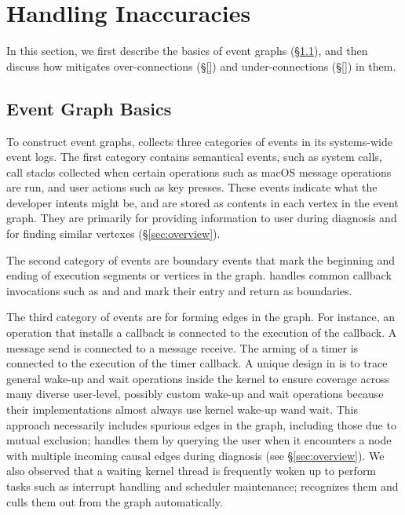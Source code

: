 \section{Handling Inaccuracies}\label{sec:graphcomputing}

In this section, we first describe the basics of \xxx event graphs
(\S\ref{subsec:eventgraph}), and then discuss how \xxx mitigates
over-connections (\S\ref{}) and under-connections (\S\ref{}) in them.

\subsection{Event Graph Basics}\label{subsec:eventgraph}

To construct event graphs, \xxx collects three categories of events in its
systems-wide event logs.  The first category contains semantical events,
such as system calls, call stacks collected when certain operations such
as macOS message operations are run, and user actions such as key presses.
These events indicate what the developer intents might be, and are stored
as contents in each vertex in the event graph.  They are primarily for
providing information to user during diagnosis and for finding similar
vertexes (\S\ref{sec:overview}).

The second category of events are boundary events that mark the beginning
and ending of execution segments or vertices in the graph.  \xxx handles
common callback invocations such as  and
 and mark their entry and return as boundaries.

The third category of events are for forming edges in the graph.  For
instance, an operation that installs a callback is connected to the
execution of the callback.  A message send is connected to a message
receive.  The arming of a timer is connected to the execution of the timer
callback.  A unique design in \xxx is to trace general wake-up and wait
operations inside the kernel to ensure coverage across many diverse
user-level, possibly custom wake-up and wait operations because their
implementations almost always use kernel wake-up wand wait.  This approach
necessarily includes spurious edges in the graph, including those due to
mutual exclusion; \xxx handles them by querying the user when it
encounters a node with multiple incoming causal edges during diagnosis
(see \S\ref{sec:overview}).  We also observed that a waiting kernel thread
is frequently woken up to perform tasks such as interrupt handling and
scheduler maintenance; \xxx recognizes them and culls them out from the
graph automatically.

